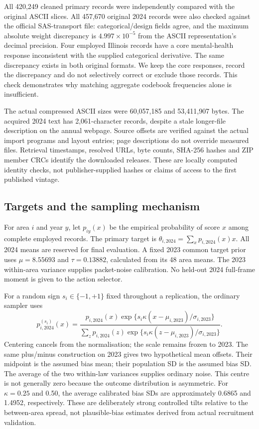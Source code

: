 All 420,249 cleaned primary records were independently compared with the original ASCII slices. All 457,670 original 2024 records were also checked against the official SAS-transport file: categorical/design fields agree, and the maximum absolute weight discrepancy is $4.997\times10^{-5}$ from the ASCII representation's decimal precision. Four employed Illinois records have a core mental-health response inconsistent with the supplied categorical derivative. The same discrepancy exists in both original formats. We keep the core responses, record the discrepancy and do not selectively correct or exclude those records. This check demonstrates why matching aggregate codebook frequencies alone is insufficient.

The actual compressed ASCII sizes were 60,057,185 and 53,411,907 bytes. The acquired 2024 text has 2,061-character records, despite a stale longer-file description on the annual webpage. Source offsets are verified against the actual import programs and layout entries; page descriptions do not override measured files. Retrieval timestamps, resolved URLs, byte counts, SHA-256 hashes and ZIP member CRCs identify the downloaded releases. These are locally computed identity checks, not publisher-supplied hashes or claims of access to the first published vintage.

\subsection{Targets and the sampling mechanism}
For area $i$ and year $y$, let $p_{iy}(x)$ be the empirical probability of score $x$ among complete employed records. The primary target is $\theta_{i,2024}=\sum_xp_{i,2024}(x)x$. All 2024 means are reserved for final evaluation. A fixed 2023 common target prior uses $\mu=8.55693$ and $\tau=0.13882$, calculated from its 48 area means. The 2023 within-area variance supplies packet-noise calibration. No held-out 2024 full-frame moment is given to the action selector.

For a random sign $s_i\in\{-1,+1\}$ fixed throughout a replication, the ordinary sampler uses
\[
 p_{i,2024}^{(s_i)}(x)=\frac{p_{i,2024}(x)\exp\{s_i\kappa(x-\mu_{i,2023})/\sigma_{i,2023}\}}
 {\sum_zp_{i,2024}(z)\exp\{s_i\kappa(z-\mu_{i,2023})/\sigma_{i,2023}\}}.
\]
Centering cancels from the normalisation; the scale remains frozen to 2023. The same plus/minus construction on 2023 gives two hypothetical mean offsets. Their midpoint is the assumed bias mean; their population SD is the assumed bias SD. The average of the two within-law variances supplies ordinary noise. This centre is not generally zero because the outcome distribution is asymmetric. For $\kappa=0.25$ and 0.50, the average calibrated bias SDs are approximately 0.6865 and 1.4952, respectively. These are deliberately strong controlled tilts relative to the between-area spread, not plausible-bias estimates derived from actual recruitment validation.

